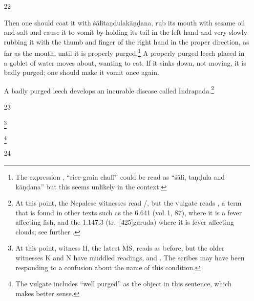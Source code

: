 \begin{translation}
\item[22]

Then one should coat it with \gls{śālitaṇḍulakāṇḍana}, rub its mouth with
sesame oil and salt and cause it to vomit by holding its tail in the left
hand and very slowly rubbing it with the thumb and finger of the right hand
in the proper direction, as far as the mouth, until it is properly purged.\footnote{The 
expression , “rice-grain chaff” could be read as “\gls{śāli}, 
\gls{taṇḍula} and \gls{kāṇḍana}” but this seems unlikely in the context.} 
A properly purged leech placed in a goblet of water moves about, wanting to
eat.  If it sinks down, not moving, it is badly purged; one should make it vomit
once again.  

A badly purged leech develops an incurable disease called 
Indrapada.\footnote{At
    this point, the Nepalese witnesses read /, 
    but the
    vulgate reads , a term that is found in other texts such as 
    the
    \cite{Manasollasa} 6.641 (vol.\,1, 87), where it is a fever affecting fish, and
    the \cite{Garudapurana} 1.147.3 (tr.\ [425]{garuda}) where it is
    fever affecting clouds; see further \cite{broo-inpress}.} 
    
\item[23]
    
    \begin{sloka}
        \footnote{At this point, witness H, the latest MS, reads
     as before, but the older witnesses K and N have muddled
    readings,  and .  The scribes may have 
    been
    responding to a  confusion about the name of this
    condition.}
    \end{sloka}
\footnote{The vulgate
    includes “well purged” as the object in this sentence, which makes better
    sense.}

\item[24]

            

\end{translation}
